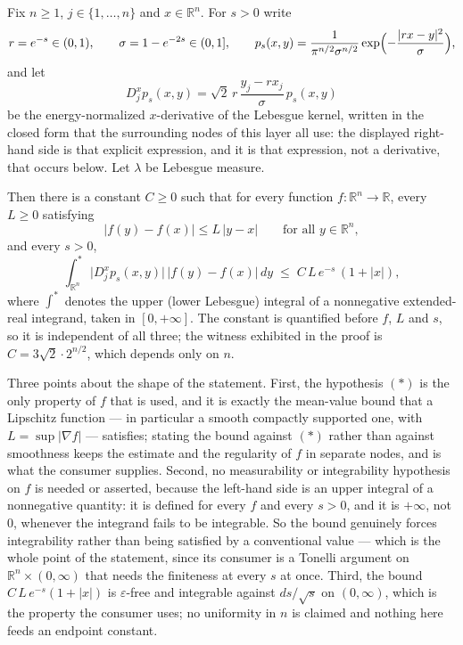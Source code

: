 \begin{lemma}
Fix $n \geq 1$, $j \in \{1,\ldots,n\}$ and $x \in \mathbb{R}^n$.  For $s > 0$ write
\[
  r = e^{-s} \in (0,1), \qquad \sigma = 1 - e^{-2s} \in (0,1],
  \qquad
  p_s(x,y) = \frac{1}{\pi^{n/2}\sigma^{n/2}}
      \exp\Bigl(-\frac{|rx-y|^2}{\sigma}\Bigr) ,
\]
and let
\[
  D_j^xp_s(x,y) = \sqrt2\,r\,\frac{y_j-rx_j}{\sigma}\,p_s(x,y)
\]
be the energy-normalized $x$-derivative of the Lebesgue kernel, written in the closed
form that the surrounding nodes of this layer all use: the displayed right-hand side is
that explicit expression, and it is that expression, not a derivative, that occurs
below.  Let $\lambda$ be Lebesgue measure.

Then there is a constant $C \geq 0$ such that for every function
$f : \mathbb{R}^n \to \mathbb{R}$, every $L \geq 0$ satisfying
\begin{equation*}
  |f(y)-f(x)| \leq L\,|y-x| \qquad \text{for all } y \in \mathbb{R}^n , \tag{$*$}
\end{equation*}
and every $s > 0$,
\[
  \int^*_{\mathbb{R}^n} \bigl|D_j^xp_s(x,y)\bigr|\,|f(y)-f(x)|\,dy
    \;\leq\; C\,L\,e^{-s}\,(1+|x|) ,
\]
where $\int^*$ denotes the upper (lower Lebesgue) integral of a nonnegative
extended-real integrand, taken in $[0,+\infty]$.  The constant is quantified before
$f$, $L$ and $s$, so it is independent of all three; the witness exhibited in the proof
is $C = 3\sqrt2\cdot2^{n/2}$, which depends only on $n$.

Three points about the shape of the statement.  First, the hypothesis $(*)$ is the only
property of $f$ that is used, and it is exactly the mean-value bound that a Lipschitz
function --- in particular a smooth compactly supported one, with $L = \sup|\nabla f|$
--- satisfies; stating the bound against $(*)$ rather than against smoothness keeps the
estimate and the regularity of $f$ in separate nodes, and is what the consumer supplies.
Second, no measurability or integrability hypothesis on $f$ is needed or asserted,
because the left-hand side is an upper integral of a nonnegative quantity: it is defined
for every $f$ and every $s > 0$, and it is $+\infty$, not $0$, whenever the integrand
fails to be integrable.  So the bound genuinely forces integrability rather than being
satisfied by a conventional value --- which is the whole point of the statement, since
its consumer is a Tonelli argument on $\mathbb{R}^n\times(0,\infty)$ that needs the
finiteness at every $s$ at once.  Third, the bound $C\,L\,e^{-s}(1+|x|)$ is
$\varepsilon$-free and integrable against $ds/\sqrt s$ on $(0,\infty)$, which is the
property the consumer uses; no uniformity in $n$ is claimed and nothing here feeds an
endpoint constant.


\end{lemma}
